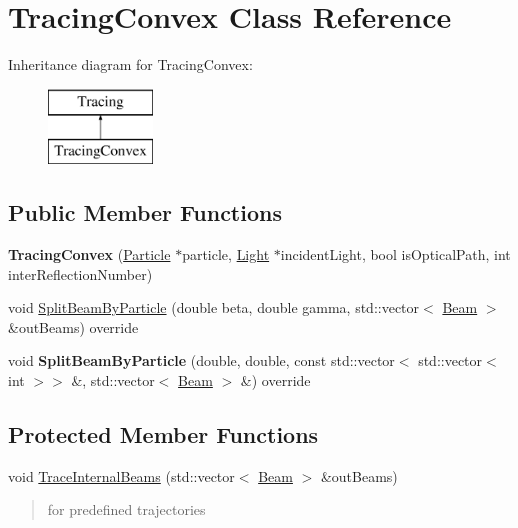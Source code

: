 \hypertarget{class_tracing_convex}{}\section{Tracing\+Convex Class Reference}
\label{class_tracing_convex}
Inheritance diagram for Tracing\+Convex\+:\begin{figure}[H]
\begin{center}
\leavevmode
\includegraphics[height=2.000000cm]{class_tracing_convex}
\end{center}
\end{figure}
\subsection*{Public Member Functions}
\begin{DoxyCompactItemize}
\item 
\mbox{\label{class_tracing_convex_af740406e6033d8546b57ff144231d79d}} 
{\bfseries Tracing\+Convex} (\mbox{\hyperlink{class_particle}{Particle}} $\ast$particle, \mbox{\hyperlink{class_light}{Light}} $\ast$incident\+Light, bool is\+Optical\+Path, int inter\+Reflection\+Number)
\item 
void \mbox{\hyperlink{class_tracing_convex_a6af4ffe46712b46b5472a7d7c930fb04}{Split\+Beam\+By\+Particle}} (double beta, double gamma, std\+::vector$<$ \mbox{\hyperlink{class_beam}{Beam}} $>$ \&out\+Beams) override
\item 
\mbox{\label{class_tracing_convex_a67d185bea9fed4c2500496495659fc2b}} 
void {\bfseries Split\+Beam\+By\+Particle} (double, double, const std\+::vector$<$ std\+::vector$<$ int $>$$>$ \&, std\+::vector$<$ \mbox{\hyperlink{class_beam}{Beam}} $>$ \&) override
\end{DoxyCompactItemize}
\subsection*{Protected Member Functions}
\begin{DoxyCompactItemize}
\item 
\mbox{\label{class_tracing_convex_a089c68d6a92e53aa7a1741586c46ee3c}} 
void \mbox{\hyperlink{class_tracing_convex_a089c68d6a92e53aa7a1741586c46ee3c}{Trace\+Internal\+Beams}} (std\+::vector$<$ \mbox{\hyperlink{class_beam}{Beam}} $>$ \&out\+Beams)
\begin{DoxyCompactList}\small\item\em \begin{quote}
for predefined trajectories \end{quote}
\end{DoxyCompactList}\end{DoxyCompactItemize}
